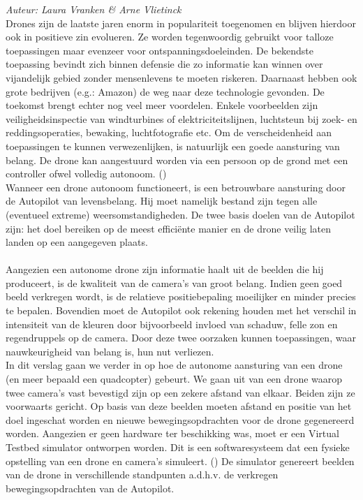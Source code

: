 {\em Auteur: Laura Vranken \& Arne Vlietinck}\\

\noindent
Drones zijn de laatste jaren enorm in populariteit toegenomen en blijven hierdoor ook in positieve zin evolueren. Ze worden tegenwoordig gebruikt voor talloze toepassingen maar evenzeer voor ontspanningsdoeleinden. De bekendste toepassing bevindt zich binnen defensie die zo informatie kan winnen over vijandelijk gebied zonder mensenlevens te moeten riskeren. Daarnaast hebben ook grote bedrijven (e.g.: Amazon) de weg naar deze technologie gevonden. De toekomst brengt echter nog veel meer voordelen. Enkele voorbeelden zijn veiligheidsinspectie van windturbines of elektriciteitslijnen, luchtsteun bij zoek- en reddingsoperaties, bewaking, luchtfotografie etc. Om de verscheidenheid aan toepassingen te kunnen verwezenlijken, is natuurlijk een goede aansturing van belang. De drone kan aangestuurd worden via een persoon op de grond met een controller ofwel volledig autonoom. (\cite{website:microdrones})
\\
Wanneer een drone autonoom functioneert, is een betrouwbare aansturing door de Autopilot van levensbelang. Hij moet namelijk bestand zijn tegen alle (eventueel extreme) weersomstandigheden. De twee basis doelen van de Autopilot zijn: het doel bereiken op de meest efficiënte manier en de drone veilig laten landen op een aangegeven plaats.
\\
\\
Aangezien een autonome drone zijn informatie haalt uit de beelden die hij produceert, is de kwaliteit van de camera's van groot belang. Indien geen goed beeld verkregen wordt, is de relatieve positiebepaling moeilijker en minder precies te bepalen. Bovendien moet de Autopilot ook rekening houden met het verschil in intensiteit van de kleuren door bijvoorbeeld invloed van schaduw, felle zon en regendruppels op de camera. Door deze twee oorzaken kunnen toepassingen, waar nauwkeurigheid van belang is, hun nut verliezen. 
\\
In dit verslag gaan we verder in op hoe de autonome aansturing van een drone (en meer bepaald een quadcopter) gebeurt. We gaan uit van een drone waarop twee camera's vast bevestigd zijn op een zekere afstand van elkaar. Beiden zijn ze voorwaarts gericht. Op basis van deze beelden moeten afstand en positie van het doel ingeschat worden en nieuwe bewegingsopdrachten voor de drone gegenereerd worden. Aangezien er geen hardware ter beschikking was, moet er een Virtual Testbed simulator ontworpen worden. Dit is een softwaresysteem dat een fysieke opstelling van een drone en camera's simuleert. (\cite{arcticle:opgavePeno}) De simulator genereert beelden van de drone in verschillende standpunten a.d.h.v. de verkregen bewegingsopdrachten van de Autopilot. 

